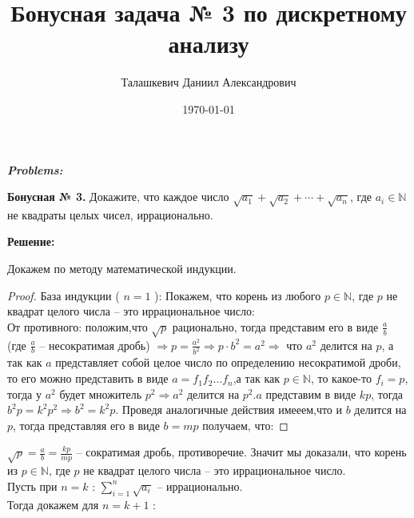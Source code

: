 \documentclass[a4paper,12pt]{article} %
\author{Талашкевич Даниил Александрович}
\title{Бонусная задача № 3 по дискретному анализу}
\date{\today}
\begin{document}
\maketitle
\thispagestyle{empty}

\newpage
\setcounter{page}{1}
\begin{center}
\itshape
\bfseries
{ \Large Problems:}
\end{center}

{\bf Бонусная № 3. }Докажите, что каждое число $\sqrt{a_{1}}+\sqrt{a_{2}}+\cdots+\sqrt{a_{n}}$, где $a_{i} \in \mathbb{N}$ не квадраты целых чисел, иррационально.

\begin{center}
\bfseries
{\Large Решение: }
\end{center}
Докажем по методу математической индукции.\\
\begin{proof}
База индукции ( $n = 1$ ):
Покажем, что корень из любого $p \in \mathbb{N}$, где $p$ не квадрат целого числа -- это иррациональное число:\\
От противного: положим,что $\sqrt{p}$ рационально, тогда представим его в виде $\frac{a}{b}$ (где $\frac{a}{b}$ -- несократимая дробь) $\Rightarrow p = \frac{a^2}{b^2} \Rightarrow p\cdot b^2 = a^2 \Rightarrow $ что $a^2$ делится на $p$, а так как $a$ представляет собой целое число по определению несократимой дроби, то его можно представить в виде $a = f_{1} f_{2}  \dots  f_{n}$,а так как $p \in \mathbb{N}$, то какое-то $f_{i} = p$, тогда у $a^2$ будет множитель $p^2 \Rightarrow a^2$ делится на $p^2$.$a$ представим в виде $kp$, тогда $b^2p = k^2p^2 \Rightarrow b^2=k^2p$. Проведя аналогичные действия имееем,что и $b$ делится на $p$, тогда  представляя его в виде $ b = mp$ получаем, что:
\end{proof}
$ \sqrt{p} = \frac{a}{b} = \frac{kp}{mp}$ -- сократимая дробь, противоречие. Значит мы доказали, что корень из $p \in \mathbb{N}$, где $p$ не квадрат целого числа -- это иррациональное число.\\
Пусть при $n = k$ : $\sum\limits_{i=1}^{n} \sqrt{a_{i}}$ -- иррационально.\\
Тогда докажем для $n = k + 1$ :
\end{document}

